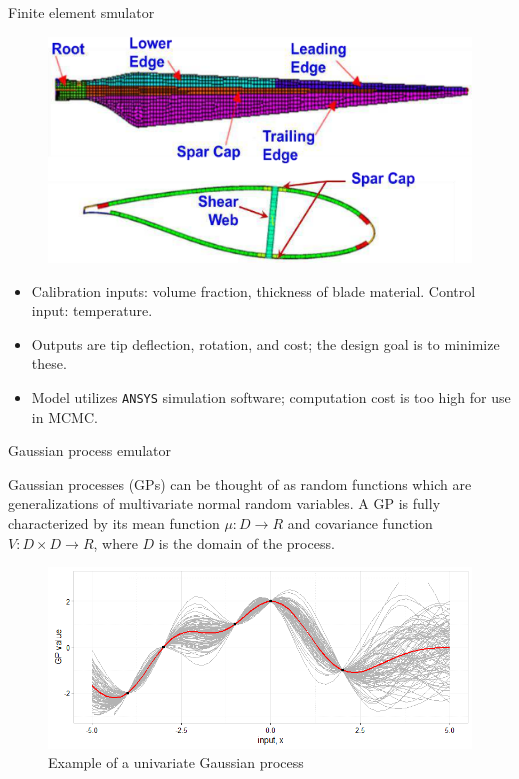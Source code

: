 \documentclass[final]{beamer}
\newlength{\onecolwid}
\newlength{\twocolwid}
\begin{document}
\begin{frame}[t]
\begin{columns}[t]
\begin{column}{\twocolwid}
\begin{columns}[t,totalwidth=\twocolwid]
\begin{column}{\onecolwid}
\begin{alertblock}{Finite element smulator}
\begin{figure}[h!]
\includegraphics[width=0.6\linewidth]{blade3}
\label{blade}
\end{figure}

\vspace{-18mm}
\begin{itemize}
\item Calibration inputs: volume fraction, thickness of blade material. Control input: temperature.


\item Outputs are tip deflection, rotation, and cost; the design goal is to minimize these.

\item Model utilizes \texttt{ANSYS} simulation software; computation cost is too high for use in MCMC.


\end{itemize}
\end{alertblock}


\begin{alertblock}{Gaussian process emulator}

Gaussian processes (GPs) can be thought of as random functions which are generalizations of multivariate normal random variables\cite{OHagan1978}. A GP is fully characterized by its mean function $\mu:D\to R$ and covariance function $V:D\times D\to R$, where $D$ is the domain of the process.

\begin{figure}[h!]
\includegraphics[width=0.95\linewidth]{../../gp_example}
\caption{Example of a univariate Gaussian process}
\label{gp_ex}
\end{figure}




\end{alertblock}
\end{column}
\end{columns}
\end{column}
\end{columns}
\end{frame}
\end{document}
